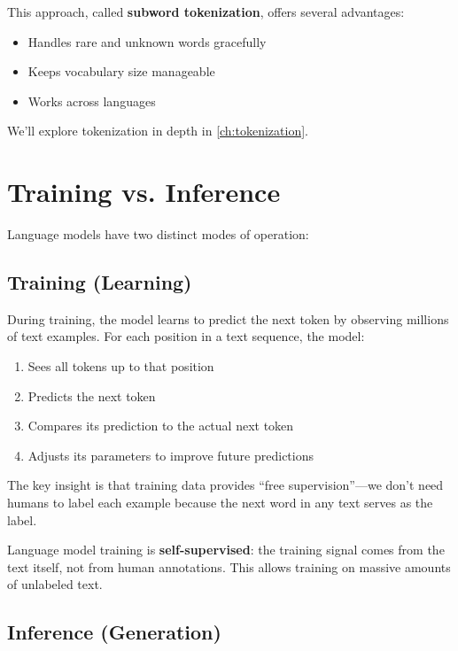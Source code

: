 This approach, called \textbf{subword tokenization}, offers several advantages:
\begin{itemize}
    \item Handles rare and unknown words gracefully
    \item Keeps vocabulary size manageable
    \item Works across languages
\end{itemize}

We'll explore tokenization in depth in \cref{ch:tokenization}.

\section{Training vs. Inference}

Language models have two distinct modes of operation:

\subsection{Training (Learning)}

During training, the model learns to predict the next token by observing millions of text examples. For each position in a text sequence, the model:
\begin{enumerate}
    \item Sees all tokens up to that position
    \item Predicts the next token
    \item Compares its prediction to the actual next token
    \item Adjusts its parameters to improve future predictions
\end{enumerate}

The key insight is that training data provides ``free supervision''---we don't need humans to label each example because the next word in any text serves as the label.

\begin{keypoint}
Language model training is \textbf{self-supervised}: the training signal comes from the text itself, not from human annotations. This allows training on massive amounts of unlabeled text.
\end{keypoint}

\subsection{Inference (Generation)}

